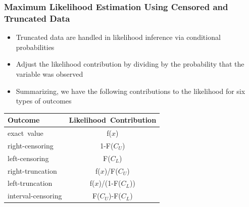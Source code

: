 \documentclass{beamer}
\begin{document}
\begin{frame}[shrink=2]
\frametitle{Maximum Likelihood Estimation Using Censored and Truncated Data}
\begin{itemize}
\item Truncated data are handled in likelihood inference via conditional probabilities \vspace{2mm}

\item Adjust the likelihood contribution by dividing by the probability that the variable was observed \vspace{2mm}

\item Summarizing, we have the following contributions to the likelihood for six types of outcomes \vspace{2mm}

\end{itemize}
\begin{center}
\begin{tabular}{lc}
\hline Outcome            & Likelihood~Contribution \\\hline
exact~value        & f($x$) \\
right-censoring    & 1-F($C_U$) \\
left-censoring     & F($C_L$) \\
right-truncation   & f($x$)/F($C_U$) \\
left-truncation    & f($x$)/(1-F($C_L$)) \\
interval-censoring & F($C_U$)-F($C_L$) \\
\hline
\end{tabular}\end{center}
\end{frame}
\end{document}
